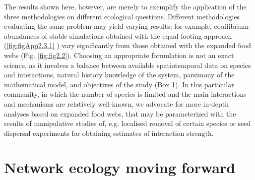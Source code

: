The results shown here, however, are merely to exemplify the application of the three methodologies on different ecological questions. Different methodologies evaluating the same problem may yield varying results; for example, equilibrium abundances of stable simulations obtained with the equal footing approach (\cref{fig:figApp2.3.1} ) vary significantly from those obtained with the expanded food webs (Fig. \ref{fig:fig2.2}). Choosing an appropriate formulation is not an exact science, as it involves a balance between available spatiotemporal data on species and interactions, natural history knowledge of the system, parsimony of the mathematical model, and objectives of the study (Box 1). In this particular community, in which the number of species is limited and the main interactions and mechanisms are relatively well-known, we advocate for more in-depth analyses based on expanded food webs, that may be parameterized with the results of manipulative studies of, e.g. localised removal of certain species or seed dispersal experiments for obtaining estimates of interaction strength.

\section{Network ecology moving forward}

